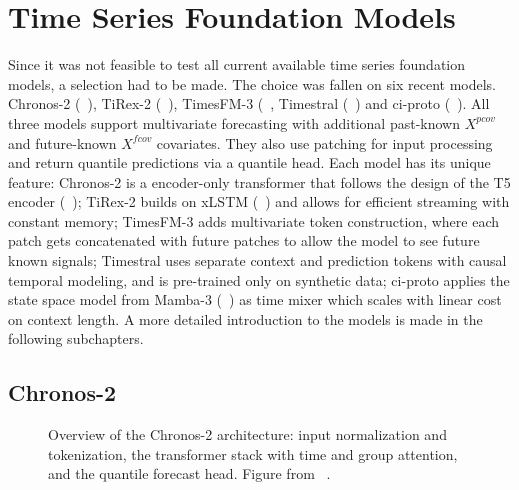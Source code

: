 \cleardoubleoddpage%
\chapter{Time Series Foundation Models}
\label{sec:foundationmodels}

Since it was not feasible to test all current available time series foundation models, a selection had to be made. The choice was fallen on six recent models. Chronos-2 (\citeauthor{chronos2}~\cite{chronos2}), TiRex-2 (\citeauthor{tirex2}~\cite{tirex2}), TimesFM-3 (\citeauthor{timesfm3}~\cite{timesfm3}, Timestral (\citeauthor{timestral}~\cite{timestral}) and ci-proto (\citeauthor{ciproto}~\cite{ciproto}). All three models support multivariate forecasting with additional past-known $X^{pcov}$ and future-known $X^{fcov}$ covariates. They also use patching for input processing and return quantile predictions via a quantile head. Each model has its unique feature: Chronos-2 is a encoder-only transformer that follows the design of the T5 encoder (\citeauthor{t5encoder}~\cite{t5encoder}); TiRex-2 builds on xLSTM (\citeauthor{xlstm}~\cite{xlstm}) and allows for efficient streaming with constant memory; TimesFM-3 adds multivariate token construction, where each patch gets concatenated with future patches to allow the model to see future known signals; Timestral uses separate context and prediction tokens with causal temporal modeling, and is pre-trained only on synthetic data; ci-proto applies the state space model from Mamba-3 (\citeauthor{mamba3}~\cite{mamba3}) as time mixer which scales with linear cost on context length. A more detailed introduction to the models is made in the following subchapters.


\section{Chronos-2}
\label{sec:foundationmodels:chronos}

\begin{figure}[htbp]
	\centering
	
	\caption[Chronos-2 architecture]{Overview of the Chronos-2 architecture:
		input normalization and tokenization, the transformer stack with time and
		group attention, and the quantile forecast head.
		Figure from \citeauthor{chronos2}~\cite{chronos2}.}
	\label{fig:chronos2}
\end{figure}

